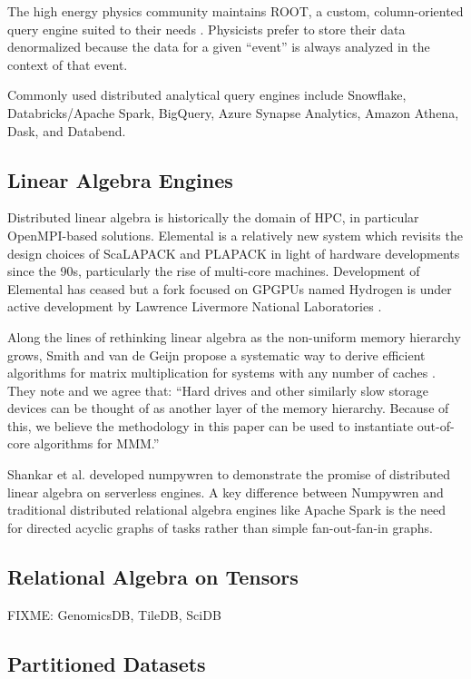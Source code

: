 \documentclass[sigconf, nonacm]{acmart}
\begin{document}
The high energy physics community maintains ROOT, a custom, column-oriented query engine suited to
their needs \cite{root}. Physicists prefer to store their data denormalized because the data for a
given ``event'' is always analyzed in the context of that event.

Commonly used distributed analytical query engines include Snowflake, Databricks/Apache Spark,
BigQuery, Azure Synapse Analytics, Amazon Athena, Dask, and Databend.

\subsection{Linear Algebra Engines}

Distributed linear algebra is historically the domain of HPC, in particular OpenMPI-based
solutions. Elemental \cite{elemental} is a relatively new system which revisits the design choices
of ScaLAPACK and PLAPACK in light of hardware developments since the 90s, particularly the rise of
multi-core machines. Development of Elemental has ceased but a fork focused on GPGPUs named Hydrogen
is under active development by Lawrence Livermore National Laboratories \cite{hydrogen}.

Along the lines of rethinking linear algebra as the non-uniform memory hierarchy grows, Smith and
van de Geijn propose a systematic way to derive efficient algorithms for matrix multiplication for
systems with any number of caches \cite{momms}. They note and we agree that: ``Hard drives and other
similarly slow storage devices can be thought of as another layer of the memory hierarchy. Because
of this, we believe the methodology in this paper can be used to instantiate out-of-core algorithms
for MMM.''

Shankar et al. developed numpywren to demonstrate the promise of distributed linear algebra on
serverless engines. A key difference between Numpywren and traditional distributed relational
algebra engines like Apache Spark is the need for directed acyclic graphs of tasks rather than
simple fan-out-fan-in graphs.

\subsection{Relational Algebra on Tensors}

FIXME: GenomicsDB, TileDB, SciDB

\subsection{Partitioned Datasets}
\end{document}
